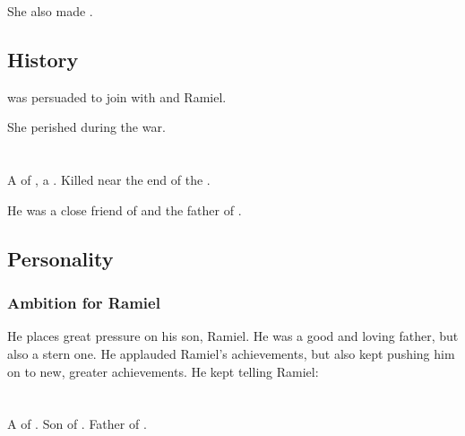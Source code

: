 She also made . 









\subsection{History}
\Lyorith{} was persuaded to join \Mystraacht{} with \Nathrach{} and Ramiel. 

She perished during the \Merkyran{} war. 















\section[Nathrach]{\Nathrach}
\index{\Nathrach}
A \resphan{} of \Mystraacht, a \sathariah. 
Killed near the end of the \secondbanewar. 

He was a close friend of  and the father of . 









\subsection{Personality}
\subsubsection{Ambition for Ramiel}
He places great pressure on his son, Ramiel. 
He was a good and loving father, but also a stern one. 
He applauded Ramiel's achievements, but also kept pushing him on to new, greater achievements. 
He kept telling Ramiel: 















\section{\Ozariel}
\index{\Ozariel}
A \ketheran{} \resphan{} of \Mystraacht. 
Son of . 
Father of . 















